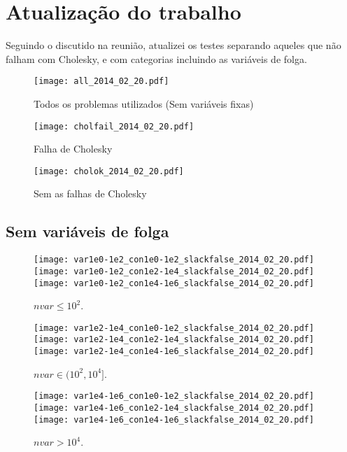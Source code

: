 \documentclass{article}
\begin{document}
\section{Atualização do trabalho}

Seguindo o discutido na reunião, atualizei os testes separando aqueles que não
falham com Cholesky, e com categorias incluindo as variáveis de folga.

\begin{figure}[H]
  \centering
  \texttt{[image: all\_2014\_02\_20.pdf]}
  \caption{Todos os problemas utilizados (Sem variáveis fixas) }
\end{figure}
\begin{figure}[H]
  \centering
  \texttt{[image: cholfail\_2014\_02\_20.pdf]}
  \caption{Falha de Cholesky}
\end{figure}
\begin{figure}[H]
  \centering
  \texttt{[image: cholok\_2014\_02\_20.pdf]}
  \caption{Sem as falhas de Cholesky}
\end{figure}

\newpage
\subsection{Sem variáveis de folga}

\begin{figure}[H]
\centering
\texttt{[image: var1e0-1e2\_con1e0-1e2\_slackfalse\_2014\_02\_20.pdf]}
\texttt{[image: var1e0-1e2\_con1e2-1e4\_slackfalse\_2014\_02\_20.pdf]}
\texttt{[image: var1e0-1e2\_con1e4-1e6\_slackfalse\_2014\_02\_20.pdf]}
\caption{ $nvar \leq 10^2$. }
\label{fig:nvar_small}
\end{figure}
\begin{figure}[H]
\centering
\texttt{[image: var1e2-1e4\_con1e0-1e2\_slackfalse\_2014\_02\_20.pdf]}
\texttt{[image: var1e2-1e4\_con1e2-1e4\_slackfalse\_2014\_02\_20.pdf]}
\texttt{[image: var1e2-1e4\_con1e4-1e6\_slackfalse\_2014\_02\_20.pdf]}
\caption{ $nvar \in (10^2,10^4]$. }
\label{fig:nvar_medium}
\end{figure}
\begin{figure}[H]
\centering
\texttt{[image: var1e4-1e6\_con1e0-1e2\_slackfalse\_2014\_02\_20.pdf]}
\texttt{[image: var1e4-1e6\_con1e2-1e4\_slackfalse\_2014\_02\_20.pdf]}
\texttt{[image: var1e4-1e6\_con1e4-1e6\_slackfalse\_2014\_02\_20.pdf]}
\caption{ $nvar > 10^4$. }
\label{fig:nvar_big}
\end{figure}
\end{document}
